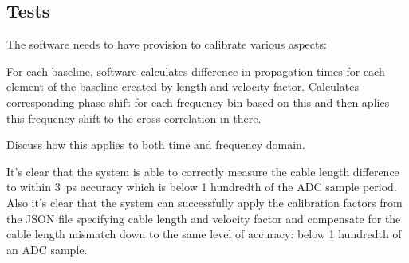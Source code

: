 \subsection{Tests}

The software needs to have provision to calibrate various aspects:

For each baseline, software calculates difference in propagation times for each element of the baseline created by length and velocity factor. Calculates corresponding phase shift for each frequency bin based on this and then aplies this frequency shift to the cross correlation in there.


Discuss how this applies to both time and frequency domain.


It's clear that the system is able to correctly measure the cable length difference to within \SI{3}{\pico\second} accuracy which is below 1 hundredth of the ADC sample period.
Also it's clear that the system can successfully apply the calibration factors from the JSON file specifying cable length and velocity factor and compensate for the cable length mismatch down to the same level of accuracy: below 1 hundredth of an ADC sample.


